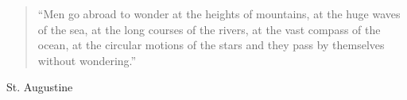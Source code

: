 \pagestyle{empty}
\vspace*{\fill}
\begin{quotation}
    \noindent ``Men go abroad to wonder at the heights of mountains, at the huge
    waves of the sea, at the long courses of the rivers, at the vast compass of
    the ocean, at the circular motions of the stars and they pass by themselves
    without wondering.''
\end{quotation}
\begin{flushright}
    St. Augustine
\end{flushright}
\vspace*{\fill}
\newpage
